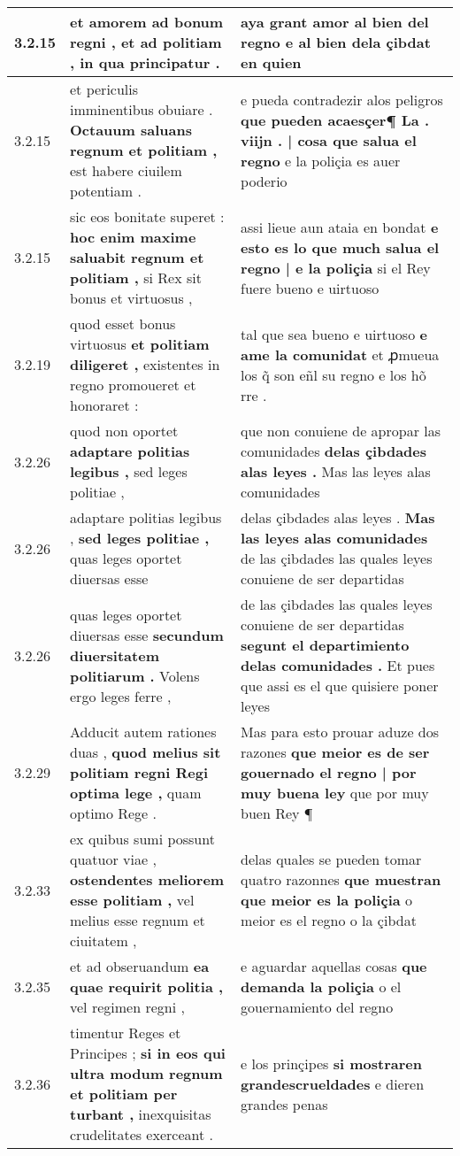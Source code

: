 \begin{tabular}{|p{1cm}|p{6.5cm}|p{6.5cm}|}
3.2.15 & et amorem ad bonum regni , \textbf{ et ad politiam , } in qua principatur . & aya grant amor al bien del regno \textbf{ e al bien dela çibdat } en quien \\\hline
3.2.15 & et periculis imminentibus obuiare . \textbf{ Octauum saluans regnum et politiam , } est habere ciuilem potentiam . & e pueda contradezir alos peligros \textbf{ que pueden acaesçer¶ La . viijn . | cosa que salua el regno } e la poliçia es auer poderio \\\hline
3.2.15 & sic eos bonitate superet : \textbf{ hoc enim maxime saluabit regnum et politiam , } si Rex sit bonus et virtuosus , & assi lieue aun ataia en bondat \textbf{ e esto es lo que much salua el regno | e la poliçia } si el Rey fuere bueno e uirtuoso \\\hline
3.2.19 & quod esset bonus virtuosus \textbf{ et politiam diligeret , } existentes in regno promoueret et honoraret : & tal que sea bueno e uirtuoso \textbf{ e ame la comunidat } et ꝓmueua los q̃ son eñl su regno e los hõ rre . \\\hline
3.2.26 & quod non oportet \textbf{ adaptare politias legibus , } sed leges politiae , & que non conuiene de apropar las comunidades \textbf{ delas çibdades alas leyes . } Mas las leyes alas comunidades \\\hline
3.2.26 & adaptare politias legibus , \textbf{ sed leges politiae , } quas leges oportet diuersas esse & delas çibdades alas leyes . \textbf{ Mas las leyes alas comunidades } de las çibdades las quales leyes conuiene de ser departidas \\\hline
3.2.26 & quas leges oportet diuersas esse \textbf{ secundum diuersitatem politiarum . } Volens ergo leges ferre , & de las çibdades las quales leyes conuiene de ser departidas \textbf{ segunt el departimiento delas comunidades . } Et pues que assi es el que quisiere poner leyes \\\hline
3.2.29 & Adducit autem rationes duas , \textbf{ quod melius sit politiam regni Regi optima lege , } quam optimo Rege . & Mas para esto prouar aduze dos razones \textbf{ que meior es de ser gouernado el regno | por muy buena ley } que por muy buen Rey ¶ \\\hline
3.2.33 & ex quibus sumi possunt quatuor viae , \textbf{ ostendentes meliorem esse politiam , } vel melius esse regnum et ciuitatem , & delas quales se pueden tomar quatro razonnes \textbf{ que muestran que meior es la poliçia } o meior es el regno o la çibdat \\\hline
3.2.35 & et ad obseruandum \textbf{ ea quae requirit politia , } vel regimen regni , & e aguardar aquellas cosas \textbf{ que demanda la poliçia } o el gouernamiento del regno \\\hline
3.2.36 & timentur Reges et Principes ; \textbf{ si in eos qui ultra modum regnum et politiam per turbant , } inexquisitas crudelitates exerceant . & e los prinçipes \textbf{ si mostraren grandescrueldades } e dieren grandes penas \\\hline

\end{tabular}
